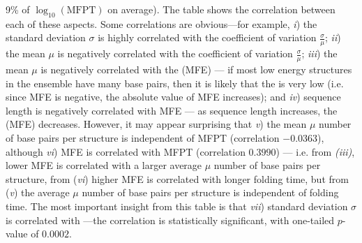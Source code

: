 \documentclass[11pt, oneside]{Thesis} %
\begin{document}
\begin{table}[!ht]
{9\% of $\log_{10}(\text{MFPT})$ on average). The table shows the correlation between each of these aspects.
Some correlations are obvious---for example,
{\em i})\;
the standard deviation $\sigma$ is highly correlated with the
coefficient of variation $\frac{\sigma}{\mu}$;
{\em ii})\;
the mean $\mu$ is negatively correlated with the
coefficient of variation $\frac{\sigma}{\mu}$;
{\em iii})\;
the mean $\mu$ is negatively correlated with the
\mfe (MFE) --- if most low energy structures in the ensemble
have many base pairs, then it is likely that the \mfe is very
low (i.e. since MFE is negative, the absolute value of MFE increases); and
{\em iv})\;
sequence length is negatively correlated with MFE --- as sequence length
increases, the \mfe (MFE) decreases.
However, it may appear surprising that
{\em v})\; the
mean $\mu$ number of base pairs per structure is independent of MFPT
(correlation $-0.0363$), although
{\em vi})\; MFE is correlated with MFPT
(correlation $0.3990$) --- i.e. from {\em (iii)},
lower MFE is correlated with a larger average $\mu$ number of base pairs per
structure, from ({\em vi})
higher MFE is correlated with longer folding time, but
from ({\em v}) the average $\mu$  number of base pairs per structure is
independent of folding time.
The most important insight from this table is that
{\em vii})\;
standard deviation $\sigma$ is correlated with \mfpt---the correlation is statistically significant, with one-tailed
$p$-value of $0.0002$.}
\label{table:correlationFFTborEmpty}
\end{table}
\end{document}
